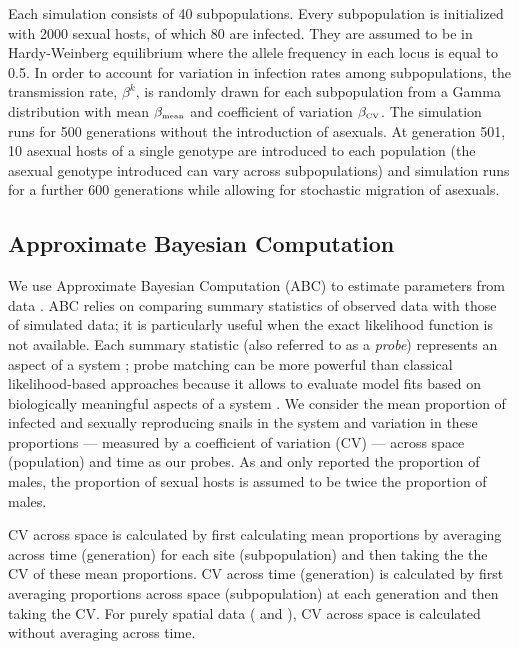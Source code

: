 \documentclass{article}\usepackage[]{graphicx}\usepackage[]{color}
\begin{document}
Each simulation consists of 40 subpopulations. 
Every subpopulation is initialized with 2000 sexual hosts, of which 80 are infected. 
They are assumed to be in Hardy-Weinberg equilibrium where the allele frequency in each locus is equal to 0.5. 
In order to account for variation in infection rates among subpopulations, the transmission rate, $\beta^k$, is randomly drawn for each subpopulation from a Gamma distribution with mean $\beta_{\textrm{\tiny mean}}$ and coefficient of variation $\beta_{\textrm{\tiny CV}}$. 
The simulation runs for 500 generations without the introduction of asexuals. At generation 501, 10 asexual hosts of a single genotype are introduced to each population (the asexual genotype introduced can vary across subpopulations) and simulation runs for a further 600 generations while allowing for stochastic migration of asexuals.

\subsection{Approximate Bayesian Computation}

We use Approximate Bayesian Computation (ABC) to estimate parameters from data \citep{toni2009approximate}.
ABC relies on comparing summary statistics of observed data with those of simulated data; it is particularly useful when the exact likelihood function is not available.
Each summary statistic (also referred to as a \emph{probe}) represents an aspect of a system \cite{kendall1999populations};
probe matching can be more powerful than classical likelihood-based approaches because it allows to evaluate model fits based on biologically meaningful aspects of a system \citep{wood2010statistical}.
We consider the mean proportion of infected and sexually reproducing snails in the system and variation in these proportions --- measured by a coefficient of variation (CV) --- across space (population) and time as our probes.
As \cite{dagan2013clonal} and \cite{mckone2016fine} only reported the proportion of males, the proportion of sexual hosts is assumed to be twice the proportion of males.

CV across space is calculated by first calculating mean proportions by averaging across time (generation) for each site (subpopulation) and then taking the the CV of these mean proportions.
CV across time (generation) is calculated by first averaging proportions across space (subpopulation) at each generation and then taking the CV.
For purely spatial data (\cite{dagan2013clonal} and \cite{mckone2016fine}), CV across space is calculated without averaging across time.
\end{document}
